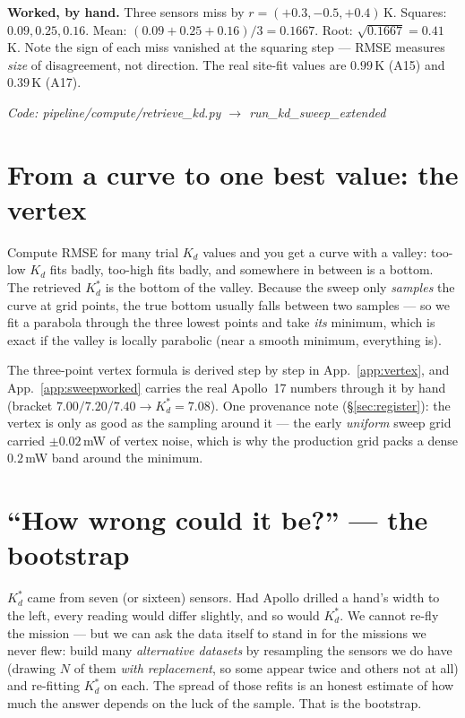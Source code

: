 \documentclass[11pt]{report}
\newcommand{\code}[1]{{\ttfamily\small #1}}
\begin{document}
\medskip
\noindent\textbf{Worked, by hand.} Three sensors miss by $r = (+0.3, -0.5,
+0.4)$\,K. Squares: $0.09, 0.25, 0.16$. Mean: $(0.09{+}0.25{+}0.16)/3 =
0.1667$. Root: $\sqrt{0.1667} = 0.41$\,K. Note the sign of each miss vanished
at the squaring step --- RMSE measures \emph{size} of disagreement, not
direction. The real site-fit values are $0.99$\,K (A15) and $0.39$\,K (A17).

{\small\color{dim}\textit{Code: \code{pipeline/compute/retrieve\_kd.py}
$\to$ \code{run\_kd\_sweep\_extended}}}

\section{From a curve to one best value: the vertex}\label{sec:vertexzero}

\begin{plain}
Compute RMSE for many trial $K_d$ values and you get a curve with a valley:
too-low $K_d$ fits badly, too-high fits badly, and somewhere in between is a
bottom. The retrieved $K_d^{*}$ is the bottom of the valley. Because the sweep
only \emph{samples} the curve at grid points, the true bottom usually falls
between two samples --- so we fit a parabola through the three lowest points
and take \emph{its} minimum, which is exact if the valley is locally
parabolic (near a smooth minimum, everything is).
\end{plain}

The three-point vertex formula is derived step by step in
App.~\ref{app:vertex}, and App.~\ref{app:sweepworked} carries the real
Apollo~17 numbers through it by hand (bracket $7.00/7.20/7.40 \rightarrow
K_d^{*}=7.08$). One provenance note (\S\ref{sec:register}): the vertex is only
as good as the sampling around it --- the early \emph{uniform} sweep grid
carried $\pm 0.02$\,mW of vertex noise, which is why the production grid packs
a dense $0.2$\,mW band around the minimum.

\section{``How wrong could it be?'' --- the bootstrap}\label{sec:bootzero}

\begin{plain}
$K_d^{*}$ came from seven (or sixteen) sensors. Had Apollo drilled a hand's
width to the left, every reading would differ slightly, and so would
$K_d^{*}$. We cannot re-fly the mission --- but we can ask the data itself to
stand in for the missions we never flew: build many \emph{alternative
datasets} by resampling the sensors we do have (drawing $N$ of them \emph{with
replacement}, so some appear twice and others not at all) and re-fitting
$K_d^{*}$ on each. The spread of those refits is an honest estimate of how
much the answer depends on the luck of the sample. That is the bootstrap.
\end{plain}
\end{document}
